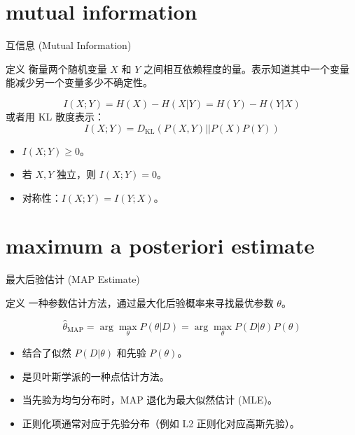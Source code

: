 \documentclass[12pt, t, aspectratio=169]{beamer}
\newcommand{\KL}{D_{\text{KL}}}
\begin{document}
\section{mutual information}
\begin{frame}{互信息 (Mutual Information)}
    \begin{block}{定义}
        衡量两个随机变量 $X$ 和 $Y$ 之间相互依赖程度的量。表示知道其中一个变量能减少另一个变量多少不确定性。
    \end{block}
    
    \begin{equation*}
        I(X; Y) = H(X) - H(X|Y) = H(Y) - H(Y|X)
    \end{equation*}
    或者用 KL 散度表示：
    \begin{equation*}
        I(X; Y) = \KL(P(X,Y) || P(X)P(Y))
    \end{equation*}
    
    \vspace{0.2cm}
    \begin{itemize}
        \item $I(X; Y) \geq 0$。
        \item 若 $X, Y$ 独立，则 $I(X; Y) = 0$。
        \item 对称性：$I(X; Y) = I(Y; X)$。
    \end{itemize}
\end{frame}

\section{maximum a posteriori estimate}
\begin{frame}{最大后验估计 (MAP Estimate)}
    \begin{block}{定义}
        一种参数估计方法，通过最大化后验概率来寻找最优参数 $\theta$。
    \end{block}
    
    \begin{equation*}
        \hat{\theta}_{\text{MAP}} = \arg\max_{\theta} P(\theta|D) = \arg\max_{\theta} P(D|\theta)P(\theta)
    \end{equation*}
    
    \vspace{0.2cm}
    \begin{itemize}
        \item 结合了似然 $P(D|\theta)$ 和先验 $P(\theta)$。
        \item 是贝叶斯学派的一种点估计方法。
        \item 当先验为均匀分布时，MAP 退化为最大似然估计 (MLE)。
        \item 正则化项通常对应于先验分布（例如 L2 正则化对应高斯先验）。
    \end{itemize}
\end{frame}
\end{document}
